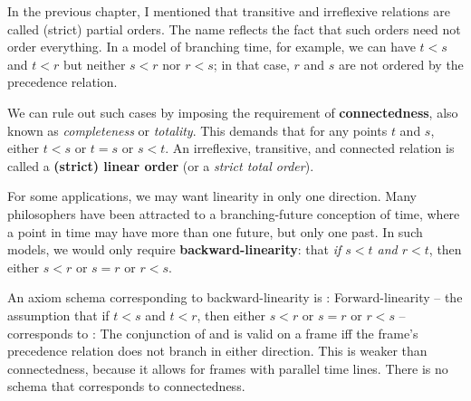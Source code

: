 \begin{figure}
  \quad
\end{figure}
In the previous chapter, I mentioned that transitive and irreflexive relations
are called (strict) partial orders. The name reflects the fact that such orders
need not order everything. In a model of branching time, for example, we can
have $t<s$ and $t<r$ but neither $s<r$ nor $r<s$; in that case, $r$ and $s$ are
not ordered by the precedence relation.

We can rule out such cases by imposing the requirement of
\textbf{connectedness}, also known as \emph{completeness} or \emph{totality}.
This demands that for any points $t$ and $s$, either $t < s$ or $t=s$ or
$s < t$.  An irreflexive, transitive, and connected relation is called a
\textbf{(strict) linear order} (or a \emph{strict total order}).

For some applications, we may want linearity in only one direction. Many
philosophers have been attracted to a branching-future conception of time,
where a point in time may have more than one future, but only one past. In
such models, we would only require \textbf{backward-linearity}: that \emph{if
  $s < t$ and $r < t$}, then either $s < r$ or $s=r$ or $r < s$.

An axiom schema corresponding to backward-linearity is :
%
%
Forward-linearity -- the assumption that if $t < s$ and $t < r$, then either
$s < r$ or $s=r$ or $r < s$ -- corresponds to :
%
%
%
The conjunction of  and  is valid on a frame iff the frame's
precedence relation does not branch in either direction. This is weaker than
connectedness, because it allows for frames with parallel time lines. There is
no schema that corresponds to connectedness.

